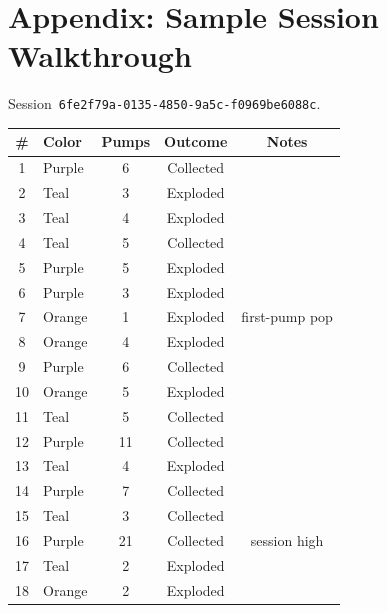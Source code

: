 \documentclass[11pt,a4paper]{article}
\begin{document}
\clearpage
\section{Appendix: Sample Session Walkthrough}

Session~\texttt{6fe2f79a-0135-4850-9a5c-f0969be6088c}.

\begin{table}[H]
\centering\small
\begin{tabular}{@{}clccc@{}}
\toprule
\textbf{\#} & \textbf{Color} & \textbf{Pumps} & \textbf{Outcome} & \textbf{Notes} \\
\midrule
 1 & \textcolor{purpleballoon}{Purple} &  6 & Collected & \\
 2 & \textcolor{tealballoon}{Teal}     &  3 & Exploded  & \\
 3 & \textcolor{tealballoon}{Teal}     &  4 & Exploded  & \\
 4 & \textcolor{tealballoon}{Teal}     &  5 & Collected & \\
 5 & \textcolor{purpleballoon}{Purple} &  5 & Exploded  & \\
 6 & \textcolor{purpleballoon}{Purple} &  3 & Exploded  & \\
 7 & \textcolor{orangeballoon}{Orange} &  1 & Exploded  & first-pump pop \\
 8 & \textcolor{orangeballoon}{Orange} &  4 & Exploded  & \\
 9 & \textcolor{purpleballoon}{Purple} &  6 & Collected & \\
10 & \textcolor{orangeballoon}{Orange} &  5 & Exploded  & \\
11 & \textcolor{tealballoon}{Teal}     &  5 & Collected & \\
12 & \textcolor{purpleballoon}{Purple} & 11 & Collected & \\
13 & \textcolor{tealballoon}{Teal}     &  4 & Exploded  & \\
14 & \textcolor{purpleballoon}{Purple} &  7 & Collected & \\
15 & \textcolor{tealballoon}{Teal}     &  3 & Collected & \\
16 & \textcolor{purpleballoon}{Purple} & 21 & Collected & session high \\
17 & \textcolor{tealballoon}{Teal}     &  2 & Exploded  & \\
18 & \textcolor{orangeballoon}{Orange} &  2 & Exploded  & \\

\end{tabular}
\end{table}
\end{document}

